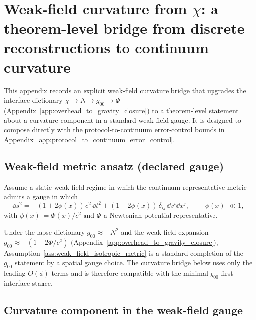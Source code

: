 \section[Weak-field curvature from \texorpdfstring{$\chi$}{chi}]{Weak-field curvature from $\chi$: a theorem-level bridge from discrete reconstructions to continuum curvature}
\label{app:weak_field_curvature_from_chi}

This appendix records an explicit weak-field curvature bridge that upgrades the interface dictionary
$\chi\to N\to g_{00}\to \Phi$ (Appendix~\ref{app:overhead_to_gravity_closure})
to a theorem-level statement about a curvature component in a standard weak-field gauge.
It is designed to compose directly with the protocol-to-continuum error-control bounds in Appendix~\ref{app:protocol_to_continuum_error_control}.

\subsection{Weak-field metric ansatz (declared gauge)}
\label{subsec:weak_field_metric_ansatz}

\begin{assumption}
\label{ass:weak_field_isotropic_metric}
\MathTag Assume a static weak-field regime in which the continuum representative metric admits a gauge in which
\begin{equation}
\label{eq:weak_field_isotropic_metric}
\dd s^2
=-(1+2\phi(x))\,c^2\,\dd t^2+(1-2\phi(x))\,\delta_{ij}\,\dd x^i\dd x^j,
\qquad
|\phi(x)|\ll 1,
\end{equation}
with $\phi(x):=\Phi(x)/c^2$ and $\Phi$ a Newtonian potential representative.
\end{assumption}

\begin{remark}\label{rem:weak_field_lapse_dictionary_relation}
\InterfaceTag Under the lapse dictionary $g_{00}\approx -N^2$ and the weak-field expansion
$g_{00}\approx -(1+2\Phi/c^2)$ (Appendix~\ref{app:overhead_to_gravity_closure}),
Assumption~\ref{ass:weak_field_isotropic_metric} is a standard completion of the $g_{00}$ statement by a spatial gauge choice.
The curvature bridge below uses only the leading $O(\phi)$ terms and is therefore compatible with the minimal $g_{00}$-first interface stance.
\end{remark}

\subsection{Curvature component in the weak-field gauge}
\label{subsec:weak_field_curvature_component}

